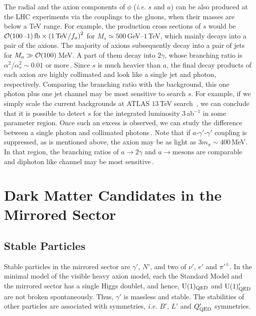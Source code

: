 \documentclass[aps,amsmath,preprint,epsf,superscriptaddress,nofootinbib,notitlepage]{revtex4-1}
\begin{document}
The radial and the axion components of $\phi$ ({\it i.e.} $s$ and $a$) can be also produced at the LHC experiments
via the couplings to the gluons, when their masses are below a TeV range.
For example, the production cross sections of $s$ would be  ${\cal O}(100$--$1)\,{\rm fb}\times \left({1\,\text{TeV}}/{f_a}\right)^2$
for $M_s \simeq 500$\,GeV--$1$\,TeV, which mainly decays into a pair of the axions.
The majority of axions subsequently decay into a pair of jets for $M_a \gg {\cal O}(100)$\,MeV. A part of them decay into $2\gamma$, whose branching ratio is $\alpha^2/\alpha_s^2 \sim 0.01$ or more\,\cite{Chiang:2016eav}.
Since $s$ is much heavier than $a$, the final decay products of each axion are highly collimated and look like a single jet and photon, respectively. Comparing the branching ratio with the background, this one photon plus one jet channel may be most sensitive to search $s$.
For example, if we simply scale the current backgrounds at ATLAS $13$\,TeV search \,\cite{Aad:2015ywd}, we can conclude that it is possible to detect $s$ for the integrated luminosity $3$\,ab${}^{-1}$ in some parameter region. Once such an excess is observed, we can study the difference between a single photon and collimated photons\,\cite{Fukuda:2016qah}. Note that if $a\mbox{-}\gamma'\mbox{-}\gamma'$ coupling is suppressed, as is mentioned above, the axion may be as light as $3m_\pi\sim400\,$MeV. In that region, the branching ratios of $a\to2\gamma$ and $a\to\text{mesons}$ are comparable and diphoton like channel may be most sensitive\,\cite{Chiang:2016eav}.


\section{Dark Matter Candidates in the Mirrored Sector}\label{sec:darkmatter}
\subsection{Stable Particles}
Stable particles in the mirrored sector are $\gamma'$, $N'$, and two of $\nu'$, $e'$ and $\pi'^{\pm}$.
In the minimal model of the visible heavy axion model, each the Standard Model and the mirrored sector
has a single Higgs doublet, and hence,  $\text{U}(1)_{\rm QED}$  and $\text{U}(1)_{\rm QED}'$ 
are not broken spontaneously.
Thus, $\gamma'$ is massless and stable.
The stabilities of other particles are associated with symmetries, {\it i.e.} $B'$, $L'$ and $Q_{\rm QED}'$ symmetries.
\end{document}
